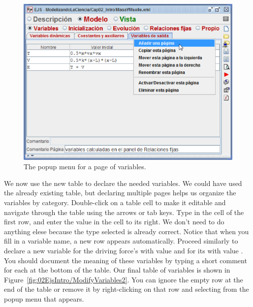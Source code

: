 \begin{figure}[htb]
    \centering
  \includegraphics[scale=\scale]{02EjsIntro/images/ModifyVariables1.eps}
    \caption{The popup menu for a page of variables.}
    \label{fig:02EjsIntro/ModifyVariables1}
\end{figure}

We now use the new table to declare the needed variables. We could have used the already existing table, but declaring multiple pages helps us organize the variables by category. Double-click on a table cell to make it editable and navigate through the table using the arrows or tab keys. Type  in the  cell of the first row, and enter the value  in the  cell to its right. We don't need to do anything elese because the  type selected is already correct. Notice that when you fill in a variable name, a new row appears automatically. Proceed similarly to declare a new variable for the driving force's  with value  and for its  with value . You should document the meaning of these variables by typing a short comment for each at the bottom of the table. Our final table of variables is shown in Figure~\ref{fig:02EjsIntro/ModifyVariables2}.  You can ignore the empty row at the end of the table or remove it by right-clicking on that row and selecting  from the popup menu that appears.

